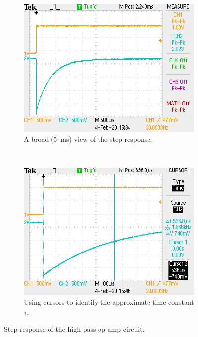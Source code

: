\documentclass{report}
\begin{document}
	\begin{figure}[h]
		\centering
		\begin{subfigure}[t]{0.5\textwidth}
			\centering
			\includegraphics[width=\textwidth]{scope/F0001TEK}
			\caption{A broad (\SI{5}{\ms}) view of the step response.}
			\label{fig:exp1step_long}
		\end{subfigure}%
		~ 
		\begin{subfigure}[t]{0.5\textwidth}
			\centering
			\includegraphics[width=\textwidth]{scope/F0003TEK}
			\caption{Using cursors to identify the approximate time constant $\tau$.}
			\label{fig:exp1step_cursors}
		\end{subfigure}
		\caption{Step response of the high-pass op amp circuit.}
	\end{figure}
\end{document}
